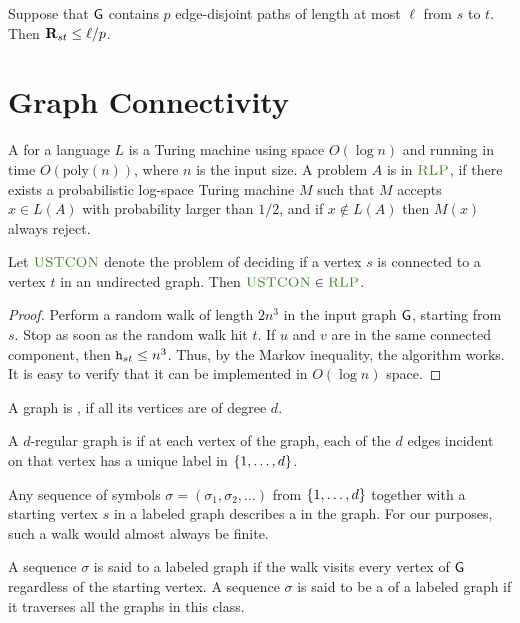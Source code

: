 \begin{lemma}
    Suppose that $\mathsf{G}$ contains $p$ edge-disjoint paths of length
    at most $\ell$ from $s$ to $t$. Then $\mathbf{R}_{st} \leq
    \ell/p$.
\end{lemma}




\section{Graph Connectivity}

\begin{defn}
    A  for a language $L$ is a Turing machine using
    space $O( \log n)$ and running in time $O(\mathrm{poly}(n))$,
    where $n$ is the input size. A problem $A$ is in $\RLP$, if there
    exists a probabilistic log-space Turing machine $M$ such that $M$
    accepts $x \in L(A)$ with probability larger than $1/2$, and if $x
    \notin L(A)$ then $M(x)$ always reject.
\end{defn}

\begin{theorem}
    Let $\USTCON$ denote the problem of deciding if a vertex $s$ is
    connected to a vertex $t$ in an undirected graph. Then $\USTCON
    \in \RLP$.
\end{theorem}

\begin{proof}
    Perform a random walk of length $2n^3$ in the input graph $\mathsf{G}$,
    starting from $s$. Stop as soon as the random walk hit $t$.  If
    $u$ and $v$ are in the same connected component, then
    $\mathtt{h}_{st} \leq n^3$. Thus, by the Markov inequality, the
    algorithm works. It is easy to verify that it can be implemented
    in $O( \log n)$ space.
\end{proof}

\begin{defn}
    A graph is , if all
    its vertices are of degree $d$.

    A $d$-regular graph is  if at each
    vertex of the graph, each of the $d$ edges incident on that vertex
    has a unique label in $\left\{ {1,\ldots,d} \right\}$.

    Any sequence of symbols $\sigma= (\sigma_1, \sigma_2, \ldots)$
    from $\left\{ {1,\ldots, d} \right\}$ together with a starting vertex $s$ in a
    labeled graph describes a  in the graph. For our
    purposes, such a walk would almost always be finite.

    A sequence $\sigma$ is said to  a labeled graph if
    the walk visits every vertex of $\mathsf{G}$ regardless of the
    starting vertex. A sequence $\sigma$ is said to be a
     of a labeled graph if it
    traverses all the graphs in this class.
\end{defn}


